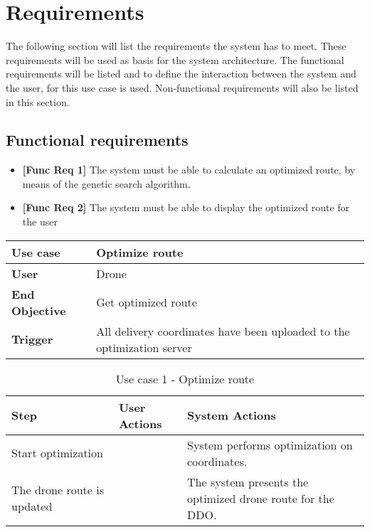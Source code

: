 
\chapter{Requirements}

The following section will list the requirements the system has to meet. These requirements will be used as basis for the system architecture. The functional requirements will be listed and to define the interaction between the system and the user, for this use case is used. Non-functional requirements will also be listed in this section. 

\section{Functional requirements}
\begin{itemize}
	\item \textbf{[Func Req 1]} The system must be able to calculate an optimized route, by means of the genetic search algorithm.
	\item \textbf{[Func Req 2]} The system must be able to display the optimized route for the user
\end{itemize}

\begin{table}[H]
	\begin{tabular}{|l|l|}
		\hline
		\cellcolor[HTML]{EFEFEF} \textbf{Use case}  & \cellcolor[HTML]{EFEFEF} \textbf{Optimize route}\\ \hline
		\cellcolor[HTML]{EFEFEF} \textbf{User} &  Drone \\ \hline
		\cellcolor[HTML]{EFEFEF} \textbf{End Objective} &  Get optimized route\\ \hline
		\cellcolor[HTML]{EFEFEF} \textbf{Trigger} & All delivery coordinates have been uploaded to the optimization server \\ \hline
	\end{tabular}
\end{table}


\begin{table}[H]
	\centering
	
	\label{Use_case_1_optimize_route}
	
	\begin{tabular}{|p{2cm}|p{5cm}|p{5cm}|}
		\hline
		\cellcolor[HTML]{EFEFEF} \textbf{Step} & \cellcolor[HTML]{EFEFEF} \textbf{User Actions}  & \cellcolor[HTML]{EFEFEF} \textbf{System Actions} \\ \hline
		\cellcolor[HTML]{EFEFEF} Start optimization &   & System performs optimization on coordinates. \\ \hline
		\cellcolor[HTML]{EFEFEF} The drone route is updated   &     &  The system presents the optimized drone route for the DDO.  \\ \hline
		
	\end{tabular}
	\caption{Use case 1 - Optimize route}
\end{table}


